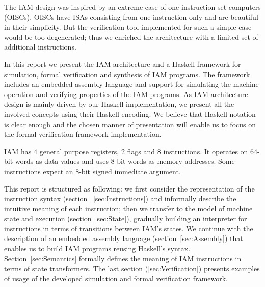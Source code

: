 The IAM design was inspired by an extreme case of one instruction
set computers (OISCs). OISCs have ISAs consisting from one instruction only and are
beautiful in their simplicity. But the verification tool implemented for such a
simple case would be too degenerated; thus we enriched the architecture with a
limited set of additional instructions.

In this report we present the IAM architecture and a Haskell framework for
simulation, formal verification and synthesis of IAM programs.
The framework includes an embedded assembly language and support for
simulating the machine operation and verifying properties of the IAM programs. As
IAM architecture design is mainly driven by our Haskell implementation, we
present all the involved concepts using their Haskell encoding. We believe that
Haskell notation is clear enough and the chosen manner of presentation will
enable us to focus on the formal verification framework implementation.

IAM has 4 general purpose registers, 2 flags and 8 instructions. It
operates on 64-bit words as data values and uses 8-bit words as memory addresses.
Some instructions expect an 8-bit signed immediate argument.

This report is structured as following: we first consider the representation of
the instruction syntax (section ~\ref{sec:Instructions}) and informally describe the intuitive meaning of each
instruction; then we transfer to the model of machine state and execution (section~\ref{sec:State}),
gradually building an interpreter for instructions in terms of transitions
between IAM's states. We continue with the description of an embedded assembly
language (section~\ref{sec:Assembly}) that enables us to build IAM programs reusing Haskell's syntax.
Section~\ref{sec:Semantics} formally defines the meaning of IAM instructions in terms of state transformers.
The last section (\ref{sec:Verification}) presents examples of usage of the developed simulation
and formal verification framework.

\clearpage